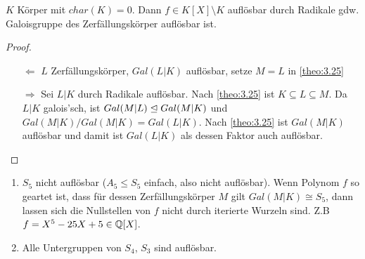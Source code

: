 \documentclass[../main.tex]{subfiles}
\begin{document}
\begin{corollary}
    $K$ Körper mit $char(K)=0$. Dann $f\in K[X]\setminus K$ auflösbar durch Radikale gdw. Galoisgruppe des Zerfällungskörper auflösbar ist.
\end{corollary}
\begin{proof} $ $
    \begin{itemize}
        \item[$\Leftarrow$]
        $L$ Zerfällungskörper, $Gal(L|K)$ auflösbar, setze $M=L$ in \ref{theo:3.25}
        \item[$\Rightarrow$]
        Sei $L|K$ durch Radikale auflösbar.
        Nach \ref{theo:3.25} ist $K\subseteq L \subseteq M$.
        Da $L|K$ galois'sch, ist $Gal(M|L)\trianglelefteq Gal(M|K)$ und $Gal(M|K)/Gal(M|K) = Gal(L|K)$.
        Nach \ref{theo:3.25} ist $Gal(M|K)$ auflösbar und damit ist $Gal(L|K)$ als dessen Faktor auch auflösbar.
    \end{itemize}
\end{proof}

\begin{example}
    \begin{enumerate}
        \item $S_5$ nicht auflösbar ($A_5 \leq S_5$ einfach, also nicht auflösbar).
        Wenn Polynom $f$ so geartet ist, dass für dessen Zerfällungskörper $M$  gilt $Gal(M|K) \cong S_5$, dann lassen sich die Nullstellen von $f$ nicht durch iterierte Wurzeln sind.
        Z.B $f=X^5-25X+5\in \mathbb{Q}[X]$.
        \item Alle Untergruppen von $S_4$, $S_3$ sind auflösbar.
    \end{enumerate}
\end{example}
\end{document}
